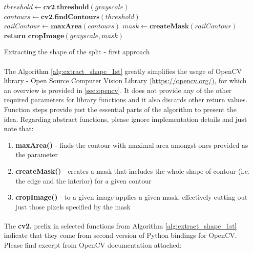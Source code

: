 \begin{algorithm}
	\begin{spacing}{1.5}
	\begin{algorithmic}[1]
			\State $threshold \gets \textbf{cv2.threshold}(grayscale)$
			\State $contours \gets \textbf{cv2.findContours}(threshold)$
			\State $railContour \gets \textbf{maxArea}(contours)$
			\State $mask \gets \textbf{createMask}(railContour)$
			\State \textbf{return} $\textbf{cropImage}(grayscale, mask)$
		\EndFunction
	\end{algorithmic}
	\end{spacing}
	\caption{Extracting the shape of the split - first approach}
	\label{alg:extract_shape_1st}
\end{algorithm}

\paragraph{}
The Algorithm \ref{alg:extract_shape_1st} greatly simplifies the usage of OpenCV library - Open Source Computer Vision Library (\url{https://opencv.org/}), for which an overview is provided in \autoref{sec:opencv}. It does not provide any of the other required parameters for library functions and it also discards other return values. Function steps provide just the essential parts of the algorithm to present the idea. Regarding abstract functions, please ignore implementation details and just note that:

\begin{enumerate}
	\item \textbf{maxArea()} - finds the contour with maximal area amongst ones provided as the parameter
	\item \textbf{createMask()} - creates a mask that includes the whole shape of contour (i.e. the edge and the interior) for a given contour
	\item \textbf{cropImage()} - to a given image applies a given mask, effectively cutting out just those pixels specified by the mask 
\end{enumerate}

\paragraph{}
The \textbf{cv2.} prefix in selected functions from Algorithm \ref{alg:extract_shape_1st} indicate that they come from second version of Python bindings for OpenCV. Please find excerpt from OpenCV documentation attached: \cite{opencv-docs}

